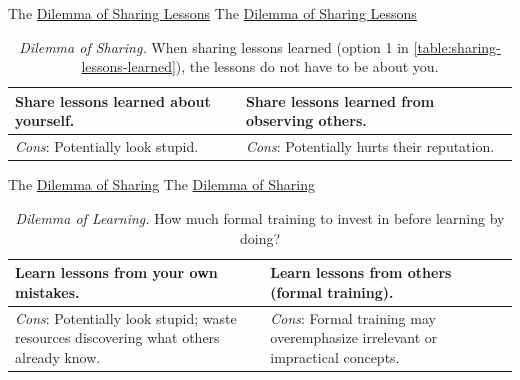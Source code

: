 The \href{table:sharing-lessons-learned}{Dilemma of Sharing Lessons}
The \href{table:sharing-lessons-learned}{Dilemma of Sharing Lessons}


\begin{center}
\begin{table}[H] %
\begin{tabular}{ | m{\dilemmatablewidth}| m{\dilemmatablewidth} | } 
  \hline
  \textbf{Share lessons learned about yourself.} & 
  \textbf{Share lessons learned from observing others.} \\ 
  \hline
  \textit{Cons}: Potentially look stupid. & 
  \textit{Cons}: Potentially hurts their reputation. \\  
  \hline
\end{tabular}
\caption{
\textit{Dilemma of Sharing.}
When sharing lessons learned (option 1 in \ref{table:sharing-lessons-learned}), the lessons do not have to be about you. 
}
\label{table:share-lessons-learned}
\end{table}
\end{center}


The \href{table:share-lessons-learned}{Dilemma of Sharing}
The \href{table:share-lessons-learned}{Dilemma of Sharing}


\begin{center}
\begin{table}[H] %
\begin{tabular}{ | m{\dilemmatablewidth}| m{\dilemmatablewidth} | } 
  \hline
  \textbf{Learn lessons from your own mistakes.} & 
  \textbf{Learn lessons from others (formal training).} \\ 
  \hline
  \textit{Cons}: Potentially look stupid; waste resources discovering what others already know. & 
  \textit{Cons}: Formal training may overemphasize irrelevant or impractical concepts. \\  
  \hline
\end{tabular}
\caption{
\textit{Dilemma of Learning.}
How much formal training to invest in before learning by doing?
}
\label{table:lessons-learned-source}
\end{table}
\end{center}


